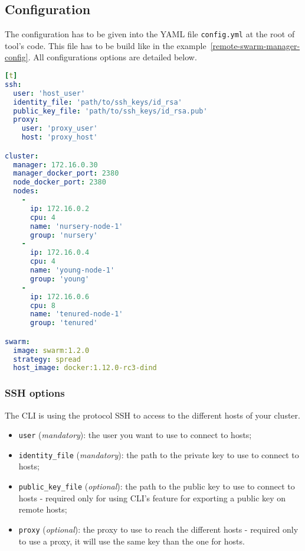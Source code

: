 
\subsection{Configuration}
\label{subsec:clustersetup:config}

The configuration has to be given into the YAML file \texttt{config.yml} at the root of tool's code.
This file has to be build like in the example~\ref{remote-swarm-manager-config}.
All configurations options are detailed below.

\begin{minipage}{\linewidth} %
\begin{lstlisting}[language=YAML,caption={Configuration file example for \textsc{RemoteSwarmManager} CLI.},label=remote-swarm-manager-config][t]
ssh:
  user: 'host_user'
  identity_file: 'path/to/ssh_keys/id_rsa'
  public_key_file: 'path/to/ssh_keys/id_rsa.pub'
  proxy:
    user: 'proxy_user'
    host: 'proxy_host'

cluster:
  manager: 172.16.0.30
  manager_docker_port: 2380
  node_docker_port: 2380
  nodes:
    -
      ip: 172.16.0.2
      cpu: 4
      name: 'nursery-node-1'
      group: 'nursery'
    -
      ip: 172.16.0.4
      cpu: 4
      name: 'young-node-1'
      group: 'young'
    -
      ip: 172.16.0.6
      cpu: 8
      name: 'tenured-node-1'
      group: 'tenured'

swarm:
  image: swarm:1.2.0
  strategy: spread
  host_image: docker:1.12.0-rc3-dind
\end{lstlisting}
\end{minipage}

\subsubsection{SSH options}

The CLI is using the protocol \textsc{SSH} to access to the different hosts of your cluster.

\begin{itemize}
  \item \texttt{user} (\emph{mandatory}): the user you want to use to connect to hosts;
  \item \texttt{identity\_file} (\emph{mandatory}): the path to the private key to use to connect to hosts;
  \item \texttt{public\_key\_file} (\emph{optional}): the path to the public key to use to connect to hosts - required only for using CLI's feature for exporting a public key on remote hosts;
  \item \texttt{proxy} (\emph{optional}): the proxy to use to reach the different hosts - required only to use a proxy, it will use the same key than the one for hosts.
\end{itemize}

